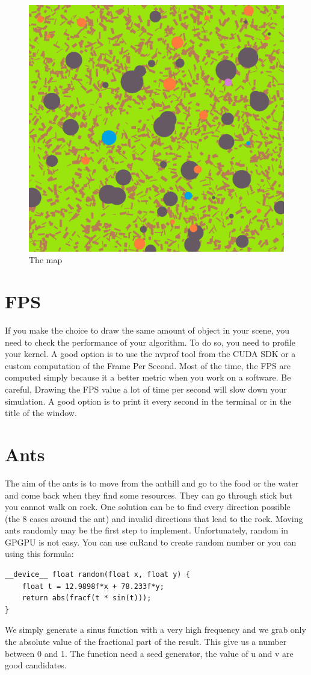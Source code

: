 \documentclass{article}
\begin{document}
\begin{figure}[H]
	\centering
	\includegraphics[scale=0.5]{figures/map.png}
	\caption{The map}
\end{figure}

\section{FPS}
If you make the choice to draw the same amount of object in your scene, you need to check the performance of your algorithm. To do so, you need to profile your kernel. A good option is to use the nvprof tool from the CUDA SDK or a custom computation of the Frame Per Second. Most of the time, the FPS are computed simply because it a better metric when you work on a software. Be careful, Drawing the FPS value a lot of time per second will slow down your simulation. A good option is to print it every second in the terminal or in the title of the window.

\section{Ants}
The aim of the ants is to move from the anthill and go to the food or the water and come back when they find some resources. They can go through stick but you cannot walk on rock. One solution can be to find every direction possible (the 8 cases around the ant) and invalid directions that lead to the rock. Moving ants randomly may be the first step to implement. Unfortunately, random in GPGPU is not easy. You can use cuRand to create random number or you can using this formula:
\begin{lstlisting}
__device__ float random(float x, float y) {
	float t = 12.9898f*x + 78.233f*y;
	return abs(fracf(t * sin(t)));
}
\end{lstlisting}
We simply generate a sinus function with a very high frequency and we grab only the absolute value of the fractional part of the result. This give us a number between 0 and 1. The function need a seed generator, the value of u and v are good candidates.
\end{document}
